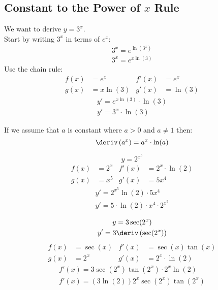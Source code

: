 \subsection{Constant to the Power of $x$ Rule}
We want to derive $y = 3^x$. \\
Start by writing $3^x$ in terms of $e^x$:
\begin{gather*}
    3^x = e^{\ln(3^x)} \\
    3^x = e^{x\ln(3)}
\end{gather*}
Use the chain rule:
\begin{align*}
    f(x) &= e^x     & f'(x) &= e^x \\
    g(x) &= x\ln(3) & g'(x) &= \ln(3)
\end{align*}
\begin{gather*}
    y' = e^{x\ln(3)} \cdot \ln(3) \\
    y' = 3^x \cdot \ln(3)
\end{gather*}
\begin{theorem}
    If we assume that $a$ is constant where $a > 0$ and $a \neq 1$ then:
    \begin{equation}
        \deriv \left(a^x\right) = a^x \cdot \ln(a)
    \end{equation}
\end{theorem}
\begin{example}
    \begin{equation*}
        y = 2^{x^5}
    \end{equation*}
    \begin{align*}
        f(x) &= 2^x & f'(x) &= 2^x \cdot \ln(2) \\
        g(x) &= x^5 & g'(x) &= 5x^4
    \end{align*}
    \begin{gather*}
        y' = 2^{x^5} \ln(2) \cdot 5x^4 \\
        y' = 5 \cdot \ln(2) \cdot x^4 \cdot 2^{x^5}
    \end{gather*}
\end{example}
\begin{example}
    \begin{gather*}
        y = 3 \sec(2^x) \\
        y' = 3 \deriv \left(\sec(2^x)\right)
    \end{gather*}
    \begin{align*}
        f(x) &= \sec(x) & f'(x) &= \sec(x)\tan(x) \\
        g(x) &= 2^x     & g'(x) &= 2^x \cdot \ln(2)
    \end{align*}
    \begin{gather*}
        f'(x) = 3 \sec(2^x) \tan(2^x) \cdot 2^x \ln(2) \\
        f'(x) = \left(3 \ln(2)\right)2^x \sec(2^x) \tan(2^x)
    \end{gather*}
\end{example}
